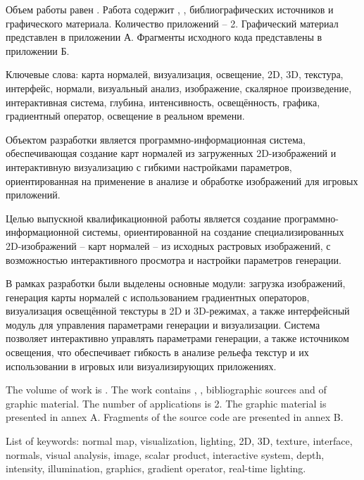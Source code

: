 
Объем работы равен . Работа содержит , ,  библиографических источников и  графического материала. Количество приложений -- 2. Графический материал представлен в приложении А. Фрагменты исходного кода представлены в приложении Б.

Ключевые слова: карта нормалей, визуализация, освещение, 2D, 3D, текстура, интерфейс, нормали, визуальный анализ, изображение, скалярное произведение, интерактивная система, глубина, интенсивность, освещённость, графика, градиентный оператор, освещение в реальном времени.

Объектом разработки является программно-информационная система, обеспечивающая создание карт нормалей из загруженных 2D-изображений и интерактивную визуализацию с гибкими настройками параметров, ориентированная на применение в анализе и обработке изображений для игровых приложений.

Целью выпускной квалификационной работы является создание программно-информационной системы, ориентированной на создание специализированных 2D-изображений -- карт нормалей -- из исходных растровых изображений, с возможностью интерактивного просмотра и настройки параметров генерации.

В рамках разработки были выделены основные модули: загрузка изображений, генерация карты нормалей с использованием градиентных операторов, визуализация освещённой текстуры в 2D и 3D-режимах, а также интерфейсный модуль для управления параметрами генерации и визуализации. Система позволяет интерактивно управлять параметрами генерации, а также источником освещения, что обеспечивает гибкость в анализе рельефа текстур и их использовании в игровых или визуализирующих приложениях.

  
The volume of work is . The work contains , ,  bibliographic sources and  of graphic material. The number of applications is 2. The graphic material is presented in annex A. Fragments of the source code are presented in annex B.

List of keywords: normal map, visualization, lighting, 2D, 3D, texture, interface, normals, visual analysis, image, scalar product, interactive system, depth, intensity, illumination, graphics, gradient operator, real-time lighting.

